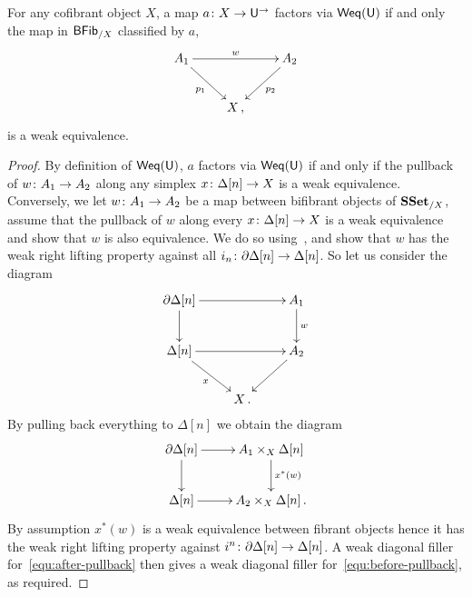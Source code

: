 \documentclass[reqno,10pt,a4paper,oneside,draft]{amsart}
\begin{document}
\begin{lemma}
\label{prop:Weq_classify_Weq}
For any cofibrant object $X$, a map $a \colon X \rightarrow \mathsf{U}^{\rightarrow}$ factors via 
 $\mathsf{Weq}(\mathsf{U})$ if and only the map in $\mathsf{BFib}_{/X}$ classified by $a$,
\[
\xymatrix{
A_1 \ar[rr]^w  \ar[dr]_{p_1} & & A_2 \ar[dl]^{p_2} \\
 & X \, , & }
 \]
is a weak equivalence.
\end{lemma}

\begin{proof} By definition of $\mathsf{Weq}(\mathsf{U})$, $a$ factors via $\mathsf{Weq}(\mathsf{U})$ if and only if the pullback of $w \colon A_1 \to A_2$ along any simplex $x \colon \Delta[n] \rightarrow X$  is a weak equivalence.  Conversely,
we let $w \colon A_1 \rightarrow A_2$ be a map between bifibrant objects of $\mathbf{SSet}_{/X}$, assume that the pullback of $w$ along every $x \colon \Delta[n] \rightarrow X$ is a weak equivalence and show that $w$ is also equivalence.  We do so using~\cite[\S 2.5.7]{henry2018wms}, and show that $w$ has the weak right lifting property against all $i_n \colon \partial \Delta[n] \rightarrow \Delta[n]$. So let us consider the diagram
\begin{equation}
\label{equ:before-pullback}
\begin{gathered}
\xymatrix{\partial \Delta[n] \ar[rr] \ar[d] & & A_1 \ar[d]^w \\
\Delta[n] \ar[rr] \ar[dr]_{x}
 & & A_2 \ar[dl] \\
& X \, .&}  
\end{gathered}
\end{equation}
By pulling back everything to $\Delta[n]$ we obtain the diagram
\begin{equation}
\label{equ:after-pullback}
\begin{gathered}
\xymatrix{
\partial \Delta[n] \ar[r] \ar[d] & A_1 \times_X \Delta[n] \ar[d]^{x^*(w)} \\
\Delta[n] \ar[r] & A_2 \times_X \Delta[n]  \, .
} 
\end{gathered}
\end{equation}
By assumption $x^*(w)$ is a weak equivalence between fibrant objects hence it has the weak right lifting property against $i^n \colon \partial \Delta[n] \rightarrow \Delta[n]$. A weak diagonal filler for~\eqref{equ:after-pullback} then gives  a weak diagonal filler for~\eqref{equ:before-pullback}, as required.
\end{proof}
\end{document}
